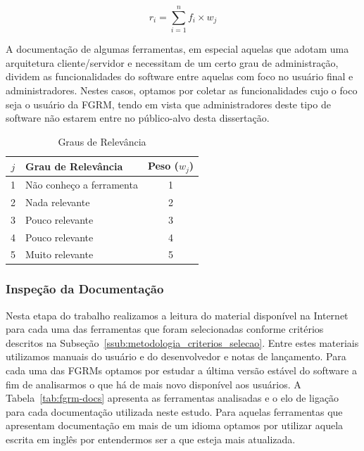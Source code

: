\begin{equation}
\label{eq:escolha_ferramenta}
r_i = \sum_{i=1}^{n} f_i \times w_j
\end{equation}

A documentação de algumas ferramentas, em especial aquelas que adotam uma
arquitetura cliente/servidor e necessitam de um certo grau de administração,
dividem as funcionalidades do software entre aquelas com foco no usuário final e
ad\-mi\-nis\-tra\-do\-res. Nestes casos, optamos por coletar as funcionalidades
cujo o foco seja o usuário da FGRM, tendo em vista que administradores deste
tipo de software não estarem entre no público-alvo desta dissertação.

\begin{table}[htpb]
\centering
\begin{tabular}{@{}clc@{}}
\toprule
\textbf{$j$} & \textbf{Grau de Relevância} & \textbf{Peso ($w_j$)} \\ \midrule
1 & Não conheço a ferramenta & 1 \\
2 & Nada relevante & 2 \\
3 & Pouco relevante & 3 \\
4 & Pouco relevante & 4 \\
5 & Muito relevante & 5 \\ \bottomrule
\end{tabular}
\caption{Graus de Relevância}
\label{tab:graus_relevancia}
\end{table}

\subsubsection{Inspeção da Documentação}
\label{subsec:inspecao_doumentacao}

Nesta etapa do trabalho realizamos a leitura do material disponível na Internet
para cada uma das ferramentas que foram selecionadas conforme critérios
descritos na Subseção~\ref{ssub:metodologia_criterios_selecao}. Entre estes
materiais utilizamos manuais do usuário e do desenvolvedor e notas de
lançamento. Para cada uma das FGRMs optamos por estudar a última versão estável
do software a fim de analisarmos o que há de mais novo disponível aos usuários.
A Tabela~\ref{tab:fgrm-docs} apresenta as ferramentas analisadas e o elo de
ligação para cada documentação utilizada neste estudo. Para aquelas ferramentas
que apresentam documentação em mais de um i\-di\-o\-ma optamos por utilizar
aquela escrita em inglês por entendermos ser a que esteja mais atualizada.

